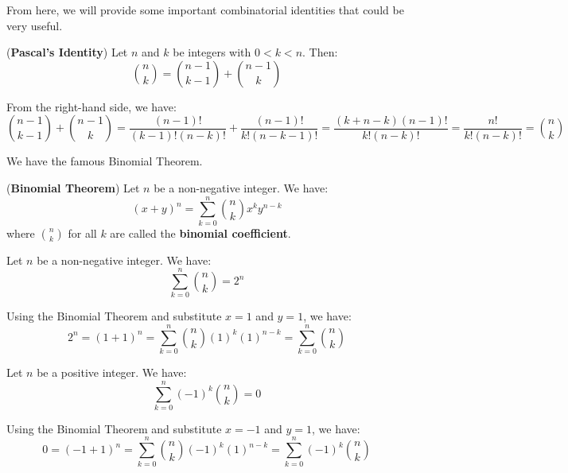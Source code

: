 \documentclass{huhtakm-template-book}
\begin{document}
\newpage
From here, we will provide some important combinatorial identities that could be very useful.
\begin{thm}(\textbf{Pascal's Identity})
	\label{Pascal's Identity (Theorem)}
	Let $n$ and $k$ be integers with $0<k<n$. Then:
	\begin{equation*}
		\binom{n}{k}=\binom{n-1}{k-1}+\binom{n-1}{k}
	\end{equation*}
\end{thm}
\begin{proofing}
	From the right-hand side, we have:
	\begin{equation*}
		\binom{n-1}{k-1}+\binom{n-1}{k}=\frac{(n-1)!}{(k-1)!(n-k)!}+\frac{(n-1)!}{k!(n-k-1)!}=\frac{(k+n-k)(n-1)!}{k!(n-k)!}=\frac{n!}{k!(n-k)!}=\binom{n}{k}
	\end{equation*}
\end{proofing}
We have the famous Binomial Theorem.
\begin{thm}(\textbf{Binomial Theorem})
	\label{Binomial Theorem}
	Let $n$ be a non-negative integer. We have:
	\begin{equation*}
		(x+y)^{n}=\sum_{k=0}^{n}\binom{n}{k}x^{k}y^{n-k}
	\end{equation*} 
	where $\binom{n}{k}$ for all $k$ are called the \textbf{binomial coefficient}.
\end{thm}
\begin{cor}
	Let $n$ be a non-negative integer. We have:
	\begin{equation*}
		\sum_{k=0}^{n}\binom{n}{k}=2^{n}
	\end{equation*}
\end{cor}
\begin{proofing}
	Using the Binomial Theorem and substitute $x=1$ and $y=1$, we have:
	\begin{equation*}
		2^{n}=(1+1)^{n}=\sum_{k=0}^{n}\binom{n}{k}(1)^{k}(1)^{n-k}=\sum_{k=0}^{n}\binom{n}{k}
	\end{equation*}
\end{proofing}
\begin{cor}
	Let $n$ be a positive integer. We have:
	\begin{equation*}
		\sum_{k=0}^{n}(-1)^{k}\binom{n}{k}=0
	\end{equation*}
\end{cor}
\begin{proofing}
	Using the Binomial Theorem and substitute $x=-1$ and $y=1$, we have:
	\begin{equation*}
		0=(-1+1)^{n}=\sum_{k=0}^{n}\binom{n}{k}(-1)^{k}(1)^{n-k}=\sum_{k=0}^{n}(-1)^{k}\binom{n}{k}
	\end{equation*}
\end{proofing}
\end{document}
